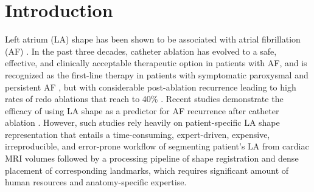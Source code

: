 \documentclass[twocolumn]{cinc}
\begin{document}
\section{Introduction}
\vspace{-0.1in}
Left atrium (LA) shape has been shown to be associated with atrial fibrillation (AF) \cite{marrouche2014decaaf, bisbal2013sphericity}. In the past three decades, catheter ablation has evolved to a safe, effective, and clinically acceptable therapeutic option in patients with AF, and is recognized as the first-line therapy in patients with symptomatic paroxysmal and persistent AF \cite{calkins20172017}, but with considerable post-ablation recurrence leading to high rates of redo ablations that reach to 40\% \cite{calkins20172017, darby2016recurrent}.
%
Recent studies demonstrate the efficacy of using LA shape as a predictor for AF recurrence after catheter ablation \cite{bieging2018left,cates2014computational,cates2013afib}.
%
However, such studies rely heavily on patient-specific LA shape representation that entails a time-consuming, expert-driven, expensive, irreproducible, and error-prone workflow of segmenting patient's LA from cardiac MRI volumes followed by a processing pipeline of shape registration and dense placement of corresponding landmarks, which requires significant amount of human resources and anatomy-specific expertise. 
\end{document}
